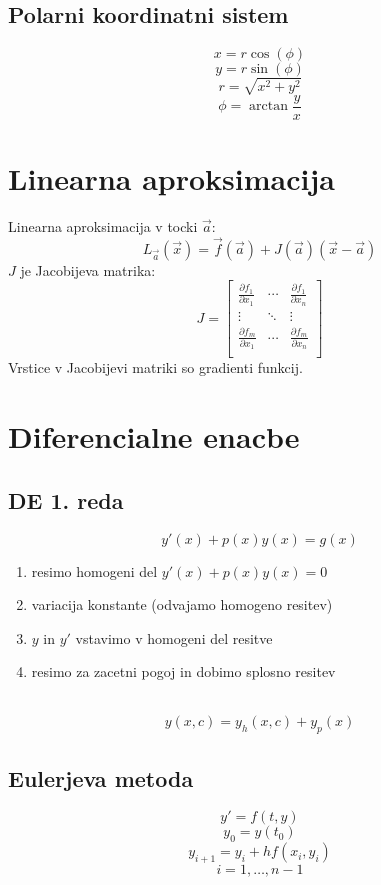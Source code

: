 \documentclass[a4paper,11pt]{article}
\begin{document}
\subsection{Polarni koordinatni sistem}
\[ x = r \cos(\phi)
\]
\[
  y = r \sin(\phi)
\]
\[
	  r = \sqrt{x^2+y^2}
\]
\[
	  \phi = \arctan{\frac{y}{x}}
\]
\section{Linearna aproksimacija}
Linearna aproksimacija v tocki \(\vec{a}\):
\[
	L_{\vec{a}}(\vec{x}) = \vec{f}(\vec{a}) + J(\vec{a})(\vec{x} - \vec{a})
\]
\(J\) je Jacobijeva matrika:
\[
	J =
	\begin{bmatrix}
		\frac{\partial f_1}{\partial x_1} & \cdots & \frac{\partial f_1}{\partial x_n} \\[0.3em]
		\vdots & \ddots & \vdots \\[0.3em]
		\frac{\partial f_m}{\partial x_1} & \cdots & \frac{\partial f_m}{\partial x_n} \\
	\end{bmatrix}
\]
Vrstice v Jacobijevi matriki so gradienti funkcij.
\section{Diferencialne enacbe}
\subsection{DE 1. reda}
\[y'(x) + p(x)y(x) = g(x)\]
\begin{enumerate}
	\item resimo homogeni del \(y'(x) + p(x)y(x) = 0\)
	\item variacija konstante (odvajamo homogeno resitev)
	\item \(y\) in \(y'\) vstavimo v homogeni del resitve
	\item resimo za zacetni pogoj in dobimo splosno resitev
\end{enumerate}
\
\[y(x,c) = y_h(x,c) + y_p(x)\]

\subsection{Eulerjeva metoda}
\[
	y' = f(t,y)
\]
\[
	y_0 = y(t_0)
\]
\[
	y_{i+1} = y_i + h f(x_i,y_i)
\]
\[
	i = 1,\ldots,n-1
\]
\end{document}

